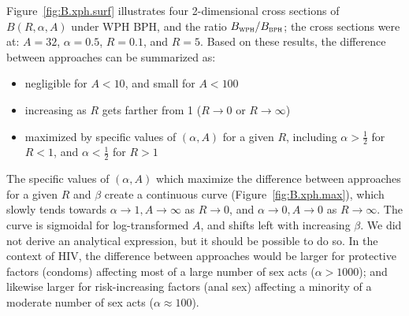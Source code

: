 Figure~\ref{fig:B.xph.surf} illustrates four 2-dimensional cross sections of $B(R,\alpha,A)$
under WPH \vs BPH, and the ratio $B_{\textsc{wph}} / B_{\textsc{bph}}$;
the cross sections were at: $A = 32$, $\alpha = 0.5$, $R = 0.1$, and $R = 5$.
Based on these results, the difference between approaches can be summarized as:
\begin{itemize}
  \item negligible for $A < 10$, and small for $A < 100$
  \item increasing as $R$ gets farther from 1 ($R \rightarrow 0$ or $R \rightarrow \infty$)
  \item maximized by specific values of $(\alpha,A)$ for a given $R$, including
    $\alpha > \frac12$ for $R < 1$, and $\alpha < \frac12$ for $R > 1$
\end{itemize}
The specific values of $(\alpha,A)$ which maximize
the difference between approaches for a given $R$ and $\beta$
create a continuous curve (Figure~\ref{fig:B.xph.max}), which slowly tends towards
$\alpha \rightarrow 1, A \rightarrow \infty$ as $R \rightarrow 0$, and
$\alpha \rightarrow 0, A \rightarrow 0$ as $R \rightarrow \infty$.
The curve is sigmoidal for log-transformed $A$,
and shifts left with increasing $\beta$.
We did not derive an analytical expression, but it should be possible to do so.
In the context of HIV, the difference between approaches would be
larger for protective factors (\eg condoms)
affecting most of a large number of sex acts ($\alpha > 1000$);
and likewise larger for risk-increasing factors (\eg anal sex)
affecting a minority of a moderate number of sex acts ($\alpha \approx 100$).
